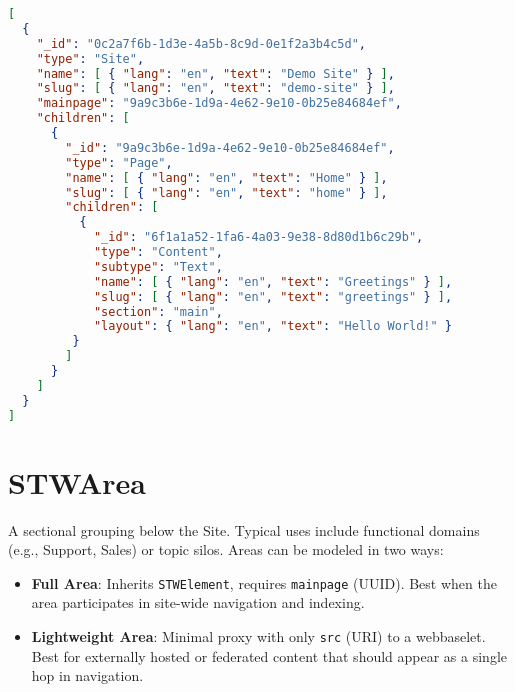 \begin{lstlisting}[language=JSON,caption={Minimal Webbase: STWSite + homepage STWPage}]
[
  {
    "_id": "0c2a7f6b-1d3e-4a5b-8c9d-0e1f2a3b4c5d",
    "type": "Site",
    "name": [ { "lang": "en", "text": "Demo Site" } ],
    "slug": [ { "lang": "en", "text": "demo-site" } ],
    "mainpage": "9a9c3b6e-1d9a-4e62-9e10-0b25e84684ef",
    "children": [
      {
        "_id": "9a9c3b6e-1d9a-4e62-9e10-0b25e84684ef",
        "type": "Page",
        "name": [ { "lang": "en", "text": "Home" } ],
        "slug": [ { "lang": "en", "text": "home" } ],
        "children": [
          {
            "_id": "6f1a1a52-1fa6-4a03-9e38-8d80d1b6c29b",
            "type": "Content",
            "subtype": "Text",
            "name": [ { "lang": "en", "text": "Greetings" } ],
            "slug": [ { "lang": "en", "text": "greetings" } ],
            "section": "main",
            "layout": { "lang": "en", "text": "Hello World!" }
         }
        ]
      }
    ]
  }
]
\end{lstlisting}

\section{STWArea}
A sectional grouping below the Site. Typical uses include functional domains (e.g., Support, Sales) or topic silos. Areas can be modeled in two ways:
\begin{itemize}
  \item \textbf{Full Area}: Inherits \texttt{STWElement}, requires \texttt{mainpage} (UUID). Best when the area participates in site-wide navigation and indexing.
  \item \textbf{Lightweight Area}: Minimal proxy with only \texttt{src} (URI) to a webbaselet. Best for externally hosted or federated content that should appear as a single hop in navigation.
\end{itemize}
